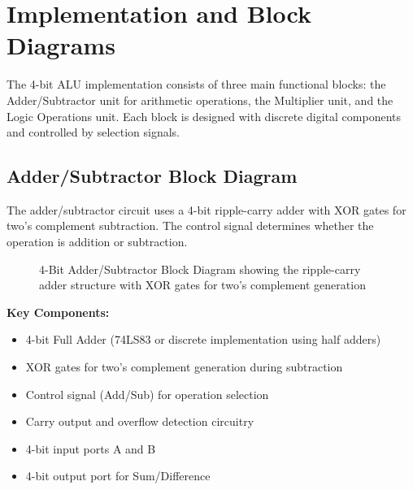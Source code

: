 \chapter{Implementation and Block Diagrams}

The 4-bit ALU implementation consists of three main functional blocks: the Adder/Subtractor unit for arithmetic operations, the Multiplier unit, and the Logic Operations unit. Each block is designed with discrete digital components and controlled by selection signals.

\section{Adder/Subtractor Block Diagram}

The adder/subtractor circuit uses a 4-bit ripple-carry adder with XOR gates for two's complement subtraction. The control signal determines whether the operation is addition or subtraction.

\begin{figure}[h]
    \centering
    \caption{4-Bit Adder/Subtractor Block Diagram showing the ripple-carry adder structure with XOR gates for two's complement generation}
    \label{fig:adder-subtractor}
\end{figure}

\textbf{Key Components:}
\begin{itemize}
    \item 4-bit Full Adder (74LS83 or discrete implementation using half adders)
    \item XOR gates for two's complement generation during subtraction
    \item Control signal (Add/Sub) for operation selection
    \item Carry output and overflow detection circuitry
    \item 4-bit input ports A and B
    \item 4-bit output port for Sum/Difference
\end{itemize}

